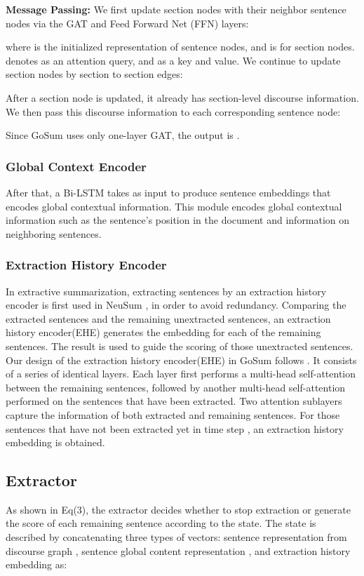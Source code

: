 \documentclass[11pt,a4paper]{article}
\begin{document}
\noindent \textbf{Message Passing:} We first update section nodes with their neighbor sentence nodes via the GAT and Feed Forward Net (FFN) layers:

where  is the initialized representation of sentence nodes, and  is for section nodes.
  denotes  as an attention query, and  as a key and value.
We continue to update section nodes by section to section edges:

 \label{eq:mp3}
After a section node is updated, it already has section-level discourse information. We then pass this discourse information to each corresponding sentence node:

Since GoSum uses only one-layer GAT, the output is .

\subsubsection{Global Context Encoder}
After that, a Bi-LSTM takes  as input to produce sentence embeddings  that encodes global contextual information. 
This module encodes global contextual information such as the sentence’s position in the document and information on neighboring sentences.


\subsubsection{Extraction History Encoder}
In extractive summarization, extracting sentences by an extraction history encoder is first used in NeuSum \cite{neusumm_history_2018}, in order to avoid redundancy.
Comparing the extracted sentences and the remaining unextracted sentences, an extraction history encoder(EHE) generates the embedding for each of the remaining sentences. The result is used to guide the scoring of those unextracted sentences.
Our design of the extraction history encoder(EHE) in GoSum follows \cite{memsum_2022}.
It consists of a series of  identical layers.
Each layer first performs a multi-head self-attention between the remaining sentences, followed by another multi-head self-attention performed on the sentences that have been extracted.
Two attention sublayers capture the information of both extracted and remaining sentences.
For those sentences that have not been extracted yet in time step , an extraction history embedding  is obtained.




\subsection{Extractor}
As shown in Eq(3), the extractor decides whether to stop extraction or generate the score of each remaining sentence according to the state.
The state  is described by concatenating three types of vectors:
sentence representation from discourse graph ,
sentence global content representation ,
and extraction history embedding  as:
\end{document}
